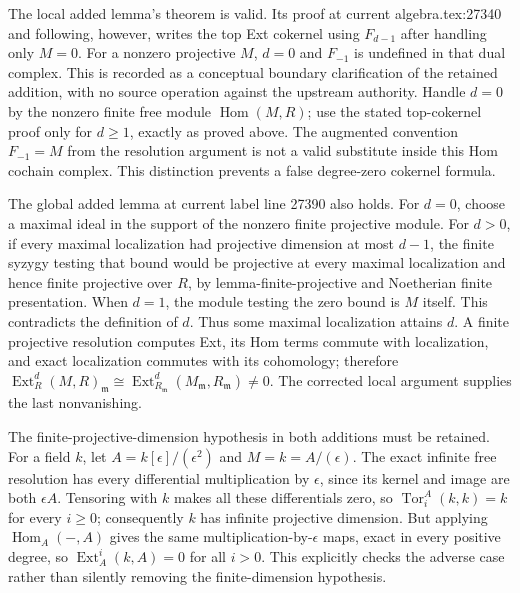 The local added lemma's theorem is valid. Its proof at current algebra.\AlgebraIdentifierBreak{}tex:\AlgebraIdentifierBreak{}27340 and following, however, writes the top Ext cokernel using \(F_{d-1}\) after handling only \(M=0\). For a nonzero projective \(M\), \(d=0\) and \(F_{-1}\) is undefined in that dual complex. This is recorded as a conceptual boundary clarification of the retained addition, with no source operation against the upstream authority. Handle \(d=0\) by the nonzero finite free module \(\operatorname{Hom}(M,R)\); use the stated top-cokernel proof only for \(d\ge1\), exactly as proved above. The augmented convention \(F_{-1}=M\) from the resolution argument is not a valid substitute inside this Hom cochain complex. This distinction prevents a false degree-zero cokernel formula.

The global added lemma at current label line 27390 also holds. For \(d=0\), choose a maximal ideal in the support of the nonzero finite projective module. For \(d>0\), if every maximal localization had projective dimension at most \(d-1\), the finite syzygy testing that bound would be projective at every maximal localization and hence finite projective over \(R\), by lemma-\AlgebraIdentifierBreak{}finite-\AlgebraIdentifierBreak{}projective and Noetherian finite presentation. When \(d=1\), the module testing the zero bound is \(M\) itself. This contradicts the definition of \(d\). Thus some maximal localization attains \(d\). A finite projective resolution computes Ext, its Hom terms commute with localization, and exact localization commutes with its cohomology; therefore \(\operatorname{Ext}^d_R(M,R)_{\mathfrak m}
\cong\operatorname{Ext}^d_{R_{\mathfrak m}}(M_{\mathfrak m},R_{\mathfrak m})\ne0\). The corrected local argument supplies the last nonvanishing.

The finite-projective-dimension hypothesis in both additions must be retained. For a field \(k\), let \(A=k[\epsilon]/(\epsilon^2)\) and \(M=k=A/(\epsilon)\). The exact infinite free resolution has every differential multiplication by \(\epsilon\), since its kernel and image are both \(\epsilon A\). Tensoring with \(k\) makes all these differentials zero, so \(\operatorname{Tor}^A_i(k,k)=k\) for every \(i\ge0\); consequently \(k\) has infinite projective dimension. But applying \(\operatorname{Hom}_A(-,A)\) gives the same multiplication-by-\(\epsilon\) maps, exact in every positive degree, so \(\operatorname{Ext}_A^i(k,A)=0\) for all \(i>0\). This explicitly checks the adverse case rather than silently removing the finite-dimension hypothesis.


